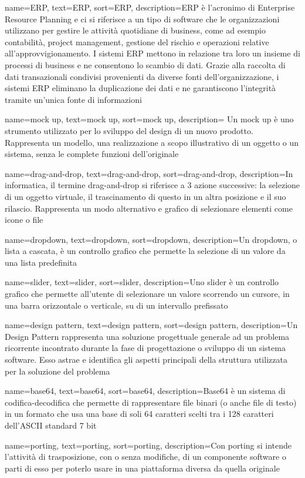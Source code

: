 {
    name={ERP},
    text=ERP,
    sort=ERP,
    description={ERP è l'acronimo di Enterprise Resource Planning e ci si riferisce a un tipo di software che le organizzazioni utilizzano per gestire le attività quotidiane di business, come ad esempio contabilità, project management, gestione del rischio e operazioni relative all'approvvigionamento. 
I sistemi ERP mettono in relazione tra loro un insieme di processi di business e ne consentono lo scambio di dati. Grazie alla raccolta di dati transazionali condivisi provenienti da diverse fonti dell'organizzazione, i sistemi ERP eliminano la duplicazione dei dati e ne garantiscono l'integrità tramite un'unica fonte di informazioni}
}


{
    name={mock up},
    text=mock up,
    sort=mock up,
    description={ Un mock up è uno strumento utilizzato per lo sviluppo del design di un nuovo prodotto. Rappresenta  un modello, una realizzazione a scopo illustrativo di un oggetto o un sistema, senza le complete funzioni dell'originale}
}

{
    name={drag-and-drop},
    text=drag-and-drop,
    sort=drag-and-drop,
    description={In informatica, il termine drag-and-drop si riferisce a 3 azione successive: la selezione di un oggetto virtuale, il trascinamento di questo in un altra posizione e il suo rilascio. Rappresenta un modo alternativo e grafico di selezionare elementi come icone o file}
}

{
    name={dropdown},
    text=dropdown,
    sort=dropdown,
    description={Un dropdown, o lista a cascata, è un controllo grafico che permette la selezione di un valore da una lista predefinita}
}

{
    name={slider},
    text=slider,
    sort=slider,
    description={Uno slider è un controllo grafico che permette all'utente di selezionare un valore scorrendo un cursore, in una barra orizzontale o verticale, su di un intervallo prefissato}
}

{
    name={design pattern},
    text=design pattern,
    sort=design pattern,
    description={Un Design Pattern rappresenta una soluzione progettuale generale ad un problema ricorrente incontrato durante la fase di progettazione o sviluppo di un sistema software. Esso astrae e identifica gli aspetti principali della struttura utilizzata per la soluzione del problema}
}

{
    name={base64},
    text=base64,
    sort=base64,
    description={Base64 è un sistema di codifica-decodifica che permette di rappresentare file binari (o anche file di testo) in un formato che usa una base di soli 64 caratteri scelti tra i 128 caratteri dell’ASCII standard 7 bit}
}


{
    name={porting},
    text=porting,
    sort=porting,
    description={Con porting si intende l'attività di trasposizione, con o senza modifiche, di un componente software o parti di esso per poterlo usare in una piattaforma diversa da quella originale}
}



